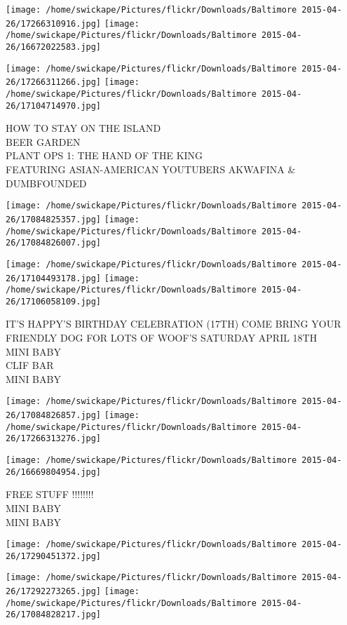 \documentclass[10pt,letterpaper]{article}
\begin{document}
\texttt{[image: /home/swickape/Pictures/flickr/Downloads/Baltimore 2015-04-26/17266310916.jpg]}
\texttt{[image: /home/swickape/Pictures/flickr/Downloads/Baltimore 2015-04-26/16672022583.jpg]}

\texttt{[image: /home/swickape/Pictures/flickr/Downloads/Baltimore 2015-04-26/17266311266.jpg]}
\texttt{[image: /home/swickape/Pictures/flickr/Downloads/Baltimore 2015-04-26/17104714970.jpg]}

HOW TO STAY ON THE ISLAND\\
BEER GARDEN\\
PLANT OPS 1: THE HAND OF THE KING\\
FEATURING ASIAN{-}AMERICAN YOUTUBERS AKWAFINA \& DUMBFOUNDED
\pagebreak

\texttt{[image: /home/swickape/Pictures/flickr/Downloads/Baltimore 2015-04-26/17084825357.jpg]}
\texttt{[image: /home/swickape/Pictures/flickr/Downloads/Baltimore 2015-04-26/17084826007.jpg]}

\texttt{[image: /home/swickape/Pictures/flickr/Downloads/Baltimore 2015-04-26/17104493178.jpg]}
\texttt{[image: /home/swickape/Pictures/flickr/Downloads/Baltimore 2015-04-26/17106058109.jpg]}

IT'S HAPPY'S BIRTHDAY CELEBRATION (17TH) COME BRING YOUR FRIENDLY DOG FOR LOTS OF WOOF'S SATURDAY APRIL 18TH\\
MINI BABY\\
CLIF BAR\\
MINI BABY
\pagebreak

\texttt{[image: /home/swickape/Pictures/flickr/Downloads/Baltimore 2015-04-26/17084826857.jpg]}
\texttt{[image: /home/swickape/Pictures/flickr/Downloads/Baltimore 2015-04-26/17266313276.jpg]}

\texttt{[image: /home/swickape/Pictures/flickr/Downloads/Baltimore 2015-04-26/16669804954.jpg]}

FREE STUFF !!!!!!!!\\
MINI BABY\\
MINI BABY
\pagebreak

\texttt{[image: /home/swickape/Pictures/flickr/Downloads/Baltimore 2015-04-26/17290451372.jpg]}

\vspace{0.25in}
\texttt{[image: /home/swickape/Pictures/flickr/Downloads/Baltimore 2015-04-26/17292273265.jpg]}
\texttt{[image: /home/swickape/Pictures/flickr/Downloads/Baltimore 2015-04-26/17084828217.jpg]}
\end{document}
